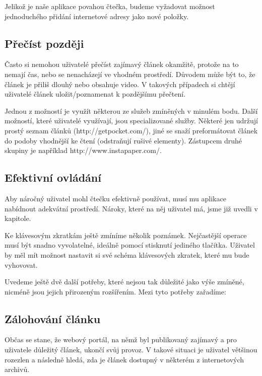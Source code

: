 Jelikož je naše aplikace povahou čtečka, budeme vyžadovat možnost jednoduchého přidání internetové adresy jako nové položky.

\subsection{Přečíst později}

Často si nemohou uživatelé přečíst zajímavý článek okamžitě, protože na to nemají čas, nebo se nenacházejí ve vhodném prostředí.
Důvodem může být to, že článek je přiliš dlouhý nebo obsahuje video.
V takových případech si chtějí uživatelé článek uložit/poznamenat k pozdějšímu přečtení.

Jednou z možností je využít některou ze služeb zmíněných v minulém bodu.
Další možností, které uživatelé využívají, jsou specializované služby.
Některé jen udržují prostý seznam článků (http://getpocket.com/), jiné se snaží preformátovat článek do podoby vhodnější ke čtení (odstraňují rušivé elementy).
Zástupcem druhé skupiny je například http://www.instapaper.com/.

\subsection{Efektivní ovládání}

Aby náročný uživatel mohl čtečku efektivně používat, musí mu aplikace nabídnout adekvátní prostředí.
Nároky, které na něj uživatel má, jsme již uvedli v kapitole. %

Ke klávesovým zkratkám ještě zmíníme několik poznámek.
Nejčastější operace musí být snadno vyvolatelné, ideálně pomocí stisknutí jediného tlačítka.
Uživatel by měl mít možnost nastavit si své schéma klávesových zkratek, které mu bude vyhovovat.

\bigskip

Uvedeme ještě dvě další potřeby, které nejsou tak důležité jako výše zmíněné, nicméně jsou jejich přirozeným rozšířením.
Mezi tyto potřeby zařadíme:

\subsection{Zálohování článku}

Občas se stane, že webový portál, na němž byl publikovaný zajímavý a pro uživatele důležitý článek, ukončí svůj provoz.
V takové situaci je uživatel většinou rozezlen a následně hledá, zda je článek dostupný v některém z internetových archivů.

